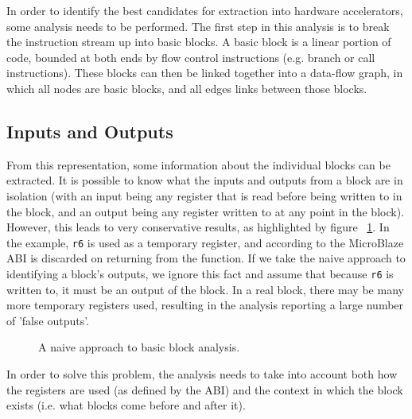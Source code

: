 \documentclass{UoYCSproject}
\newenvironment{monospace}{\ttfamily}{\par}
\begin{document}
In order to identify the best candidates for extraction into hardware accelerators, some analysis needs to be performed.
The first step in this analysis is to break the instruction stream up into basic blocks. A basic block is a linear portion of
code, bounded at both ends by flow control instructions (e.g. branch or call instructions). These blocks can then be linked
together into a data-flow graph, in which all nodes are basic blocks, and all edges links between those blocks.

\subsection{Inputs and Outputs}

From this representation, some information about the individual blocks can be extracted. It is possible to know what the inputs
and outputs from a block are in isolation (with an input being any register that is read before being written to in the block,
and an output being any register written to at any point in the block). However, this leads to very conservative results, as
highlighted by figure ~\ref{fig:analysisNaiveApproach}. In the example, \texttt{r6} is used as a temporary register, and
according to the MicroBlaze ABI \cite{microblaze-ref} is discarded on returning from the function. If we take the naive approach
to identifying a block's outputs, we ignore this fact and assume that because \texttt{r6} is written to, it must be an output of
the block. In a real block, there may be many more temporary registers used, resulting in the analysis reporting a large number
of 'false outputs'.

\begin{figure}[h]
  \begin{center}
    \begin{minipage}{0.5\linewidth}
      \begin{monospace}
      
      \end{monospace}
    \end{minipage}
  \end{center}

  \caption{A naive approach to basic block analysis.}
  \label{fig:analysisNaiveApproach}
\end{figure}

In order to solve this problem, the analysis needs to take into account both how the registers are used (as defined by the
ABI) and the context in which the block exists (i.e. what blocks come before and after it).
\end{document}

